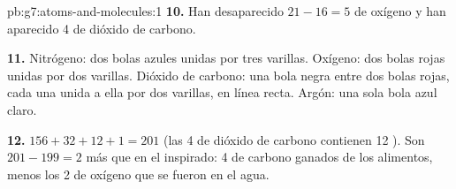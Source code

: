 \begin{solution}{pb:g7:atoms-and-molecules:1}
\textbf{10.} Han desaparecido $21 - 16 = 5$  de oxígeno y han
aparecido 4  de dióxido de carbono.

\textbf{11.} Nitrógeno: dos bolas azules unidas por tres varillas.
Oxígeno: dos bolas rojas unidas por dos varillas. Dióxido de carbono:
una bola negra entre dos bolas rojas, cada una unida a ella por dos
varillas, en línea recta. Argón: una sola bola azul claro.

\textbf{12.} $156 + 32 + 12 + 1 = 201$  (las 4  de
dióxido de carbono contienen 12 ). Son $201 - 199 = 2$  más
que en el  inspirado: 4  de carbono ganados de los alimentos,
menos los 2  de oxígeno que se fueron en el agua.
\end{solution}

